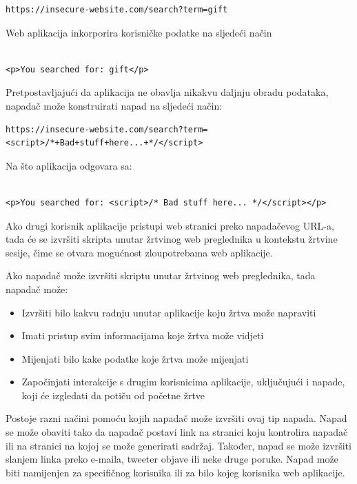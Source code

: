 \documentclass[12pt, oneside, onecolumn]{book}
\begin{document}
{\begin{verbatim}
https://insecure-website.com/search?term=gift
\end{verbatim}

Web aplikacija inkorporira korisničke podatke na sljedeći način

\begin{verbatim}

<p>You searched for: gift</p>

\end{verbatim}

Pretpostavljajući da aplikacija ne obavlja nikakvu daljnju obradu podataka, napadač može konstruirati napad na sljedeći način:

\begin{verbatim}
https://insecure-website.com/search?term=
<script>/*+Bad+stuff+here...+*/</script>
\end{verbatim}

Na što aplikacija odgovara sa:

\begin{verbatim}

<p>You searched for: <script>/* Bad stuff here... */</script></p>

\end{verbatim}

Ako drugi korisnik aplikacije pristupi web stranici preko napadačevog URL-a, tada će se izvršiti skripta unutar žrtvinog web preglednika u kontekstu žrtvine sesije, čime se otvara mogućnost zloupotrebama web aplikacije.

Ako napadač može izvršiti skriptu unutar žrtvinog web preglednika, tada napadač može:

\begin{itemize}
\item Izvršiti bilo kakvu radnju unutar aplikacije koju žrtva može napraviti
\item Imati pristup svim informacijama koje žrtva može vidjeti
\item Mijenjati bilo kake podatke koje žrtva može mijenjati
\item Započinjati interakcije s drugim korisnicima aplikacije, uključujući i napade, koji će izgledati da potiču od početne žrtve
\end{itemize}

Postoje razni načini pomoću kojih napadač može izvršiti ovaj tip napada. Napad se može obaviti tako da napadač postavi link na stranici koju kontrolira napadač ili na stranici na kojoj se može generirati sadržaj. Također, napad se može izvršiti slanjem linka preko e-maila, tweeter objave ili neke druge poruke. Napad može biti namijenjen za specifičnog korisnika ili za bilo kojeg korisnika web aplikacije. 

}
\end{document}
